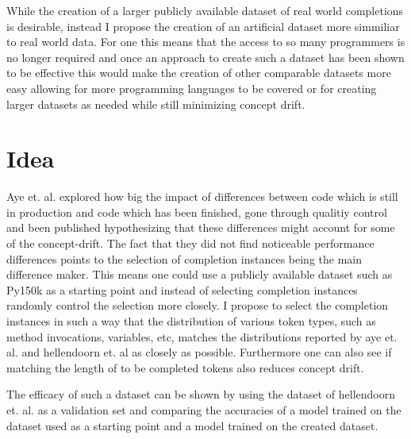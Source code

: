 \documentclass[sigplan,screen,10pt]{acmart}
\begin{document}
While the creation of a larger publicly available dataset of real world completions is desirable, instead I propose the creation of an artificial dataset more simmiliar to real world data.
For one this means that the access to so many programmers is no longer required and once an approach to create such a dataset has been shown to be effective this would make the creation of other comparable datasets more easy allowing for more programming languages to be covered or for creating larger datasets as needed while still minimizing concept drift.

\section{Idea}
Aye et. al.\cite{https://doi.org/10.48550/arxiv.2011.04542} explored how big the impact of differences between code which is still in production and code which has been finished, gone through qualitiy control and been published hypothesizing that these differences might account for some of the concept-drift.
The fact that they did not find noticeable performance differences points to the selection of completion instances being the main difference maker.
This means one could use a publicly available dataset such as Py150k as a starting point and instead of selecting completion instances randomly control the selection more closely.
I propose to select the completion instances in such a way that the distribution of various token types, such as method invocations, variables, etc, matches the distributions reported by aye et. al.\cite{https://doi.org/10.48550/arxiv.2011.04542} and hellendoorn et. al\cite{8812116} as closely as possible.
Furthermore one can also see if matching the length of to be completed tokens also reduces concept drift.

The efficacy of such a dataset can be shown by using the dataset of hellendoorn et. al. as a validation set and comparing the accuracies of a model trained on the dataset used as a starting point and a model trained on the created dataset.




\end{document}
